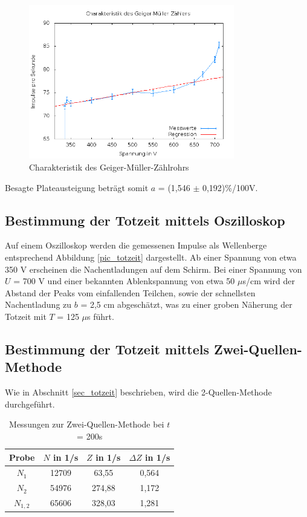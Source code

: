 \begin{figure}[H]
 \includegraphics[width=0.8\textwidth]{pics/charakteristik.png}
 \caption{Charakteristik des Geiger-Müller-Zählrohrs}
 \label{pic_plateau}
\end{figure}
Besagte Plateausteigung beträgt somit $a$ = (1,546 $\pm$ 0,192)\%/100V.

\subsection{Bestimmung der Totzeit mittels Oszilloskop}
Auf einem Oszilloskop werden die gemessenen Impulse als Wellenberge entsprechend Abbildung \ref{pic_totzeit} dargestellt. Ab einer
Spannung von etwa 350 V erscheinen die Nachentladungen auf dem Schirm. Bei einer Spannung von $U$ = 700 V und einer bekannten
Ablenkspannung von etwa 50 $\mu$s/cm wird der Abstand der Peaks vom einfallenden Teilchen, sowie der schnellsten Nachentladung zu
$b$ = 2,5 cm abgeschätzt, was zu einer groben Näherung der Totzeit mit $T$ = 125 $\mu$s führt.

\subsection{Bestimmung der Totzeit mittels Zwei-Quellen-Methode}
Wie in Abschnitt \ref{sec_totzeit} beschrieben, wird die 2-Quellen-Methode durchgeführt.

\begin{table}[H]
 \begin{tabular}{c|c|c|c}
Probe & $N$ in 1/s & $Z$ in 1/s & $\Delta Z$ in 1/s \\
\hline
$N_1$	& 12709 & 63,55 & 0,564\\
$N_2$ & 54976 & 274,88 & 1,172\\
$N_{1,2}$ & 65606 & 328,03 & 1,281
  
 \end{tabular}
\caption{Messungen zur Zwei-Quellen-Methode bei $t$ = 200s}
\label{tab_2quellen}
\end{table}

